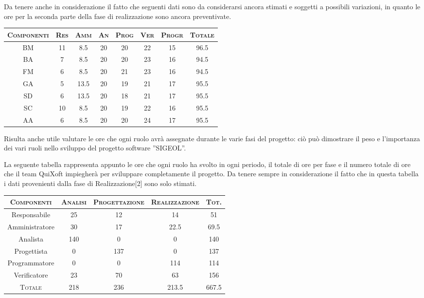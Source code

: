 \documentclass[11pt,a4paper]{article}
\begin{document}
Da tenere anche in considerazione il fatto che seguenti dati sono da considerarsi ancora stimati e soggetti a possibili variazioni, in quanto le ore per la seconda parte della fase di realizzazione sono ancora preventivate.
\\ \bigskip
\begin{center}
\begin{tabular}{|c||c|c|c|c|c|c||c|}
\hline
\textsc{Componenti} & \textsc{Res} & \textsc{Amm} & \textsc{An} & \textsc{Prog} & \textsc{Ver} & \textsc{Progr} & \textsc{Totale}\\
\hline \hline
BM & 11 & 8.5 & 20 & 20 & 22 & 15 & 96.5 \\ \hline
BA & 7 & 8.5 & 20 & 20 & 23 & 16 & 94.5 \\ \hline
FM & 6 & 8.5 & 20 & 21 & 23 & 16 & 94.5 \\ \hline
GA & 5 & 13.5 & 20 & 19 & 21 & 17 & 95.5 \\ \hline
SD & 6 & 13.5 & 20 & 18 & 21 & 17 & 95.5 \\ \hline
SC & 10 & 8.5 & 20 & 19 & 22 & 16 & 95.5 \\ \hline
AA & 6 & 8.5 & 20 & 20 & 24 & 17 & 95.5 \\ \hline
\end{tabular}
\end{center}
\bigskip

Risulta anche utile valutare le ore che ogni ruolo avrà assegnate durante le varie fasi del progetto: ciò può dimostrare il peso e l'importanza dei vari ruoli nello sviluppo del progetto software ''SIGEOL''.

La seguente tabella rappresenta appunto le ore che ogni ruolo ha svolto in ogni periodo, il totale di ore per fase e il numero totale di ore che il team QuiXoft impiegherà per sviluppare completamente il progetto. Da tenere sempre in considerazione il fatto che in questa tabella i dati provenienti dalla fase di Realizzazione[2] sono solo stimati.
\\
\begin{center}
\begin{tabular}{|c||c|c|c||c|}
\hline
\textsc{Componenti}& \textsc{Analisi} & \textsc{Progettazione} & \textsc{Realizzazione} & \textsc{Tot.} \\ \hline \hline
Responsabile & 25 & 12 & 14 & 51 \\ \hline
Amministratore & 30 & 17 & 22.5 & 69.5 \\ \hline
Analista & 140 & 0 & 0 & 140 \\ \hline
Progettista & 0 & 137 & 0 & 137 \\ \hline
Programmatore & 0 & 0 & 114 & 114 \\ \hline
Verificatore & 23 & 70 & 63 & 156 \\ \hline \hline
\textsc{Totale} & 218 & 236 & 213.5 & 667.5 \\ \hline
\end{tabular}
\end{center}
\bigskip
\end{document}

